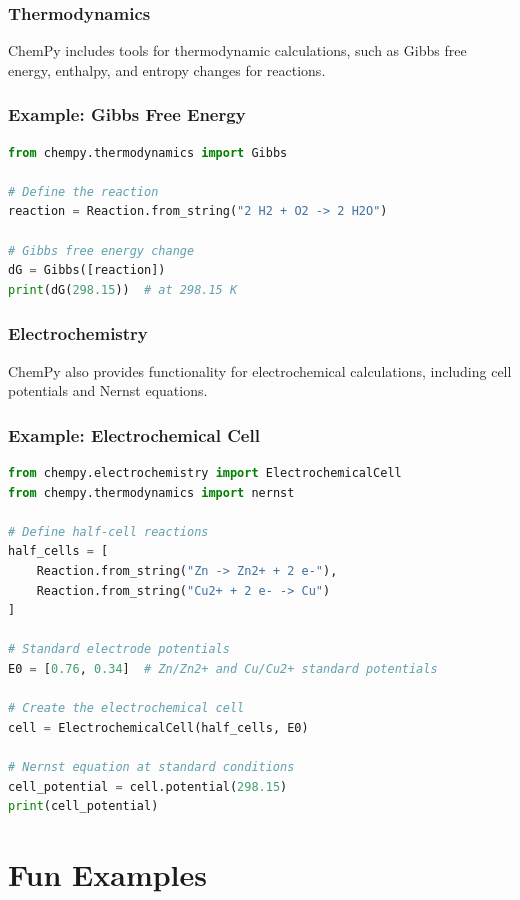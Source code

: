 \documentclass[aspectratio=169]{beamer}
\begin{document}
\begin{frame}
    \frametitle{Thermodynamics}
    ChemPy includes tools for thermodynamic calculations, such as Gibbs free energy, enthalpy, and entropy changes for reactions.
\end{frame}

\begin{frame}[fragile]
    \frametitle{Example: Gibbs Free Energy}
    \begin{lstlisting}[language=python]
from chempy.thermodynamics import Gibbs

# Define the reaction
reaction = Reaction.from_string("2 H2 + O2 -> 2 H2O")

# Gibbs free energy change
dG = Gibbs([reaction])
print(dG(298.15))  # at 298.15 K
    \end{lstlisting}
\end{frame}

\begin{frame}[fragile]
    \frametitle{Electrochemistry}
    ChemPy also provides functionality for electrochemical calculations, including cell potentials and Nernst equations.
\end{frame}

\begin{frame}[fragile]
    \frametitle{Example: Electrochemical Cell}
    \begin{lstlisting}[language=python]
from chempy.electrochemistry import ElectrochemicalCell
from chempy.thermodynamics import nernst

# Define half-cell reactions
half_cells = [
    Reaction.from_string("Zn -> Zn2+ + 2 e-"),
    Reaction.from_string("Cu2+ + 2 e- -> Cu")
]

# Standard electrode potentials
E0 = [0.76, 0.34]  # Zn/Zn2+ and Cu/Cu2+ standard potentials

# Create the electrochemical cell
cell = ElectrochemicalCell(half_cells, E0)

# Nernst equation at standard conditions
cell_potential = cell.potential(298.15)
print(cell_potential)
    \end{lstlisting}
\end{frame}

\section{Fun Examples}
\end{document}
